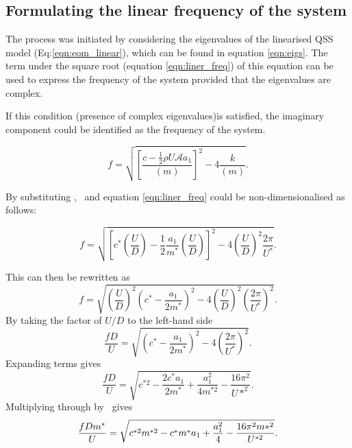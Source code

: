 \subsection{Formulating the linear frequency of the system}

The process was initiated by considering the eigenvalues of the linearised QSS model (Eq:\ref{eqn:eom_linear}), which can be found in equation \ref{eqn:eigs}. The term under the square root (equation \ref{eqn:liner_freq}) of this equation can be used to express the frequency of the system provided that the eigenvalues are complex. 

If this condition (presence of complex eigenvalues)is satisfied, the imaginary component could be identified as the frequency of the system. 

\begin{equation}
\label{eqn:liner_freq}
f = \sqrt{\left[\frac{c-\frac{1}{2}\rho U\mathcal{A}a_1}{(m)}\right]^2-4\frac{k}{(m)}}.
\end{equation}



By substituting \cstar, \mstar\ and \ustar equation \ref{eqn:liner_freq} could be non-dimensionalised as follows:

\begin{equation}
f = \sqrt{\left[c^*\left(\frac{U}{D}\right) - \frac{1}{2}\frac{a_1}{m^*}\left(\frac{U}{D}\right)\right]^2 - 4\left(\frac{U}{D}\right)^2\frac{2\pi}{U^*}}.
\end{equation}

This can then be rewritten as
\begin{equation}
f = \sqrt{\left(\frac{U}{D}\right)^2\left(c^*-\frac{a_1}{2m^*}\right)^2 - 4\left(\frac{U}{D}\right)^2\left(\frac{2\pi}{U^*}\right)^2}.
\end{equation}
By taking the factor of $U/D$ to the left-hand side
\begin{equation}
\frac{fD}{U} = \sqrt{\left(c^*-\frac{a_1}{2m^*}\right)^2 - 4\left(\frac{2\pi}{U^*}\right)^2}.
\end{equation}
Expanding terms gives
\begin{equation}
\frac{fD}{U} = \sqrt{c^{*2} - \frac{2c^*a_1}{2m^*} + \frac{a_1^2}{4m^{*2}} - \frac{16\pi^2}{U*^2}}.
\end{equation}
Multiplying through by \mstar\ gives
\begin{equation}
\frac{fDm^{*}}{U} = \sqrt{c^{*2}m^{*2} - c^*m^*a_1 + \frac{a_1^2}{4} - \frac{16\pi^2m{*^2}}{U^{*2}}}.
\end{equation}


